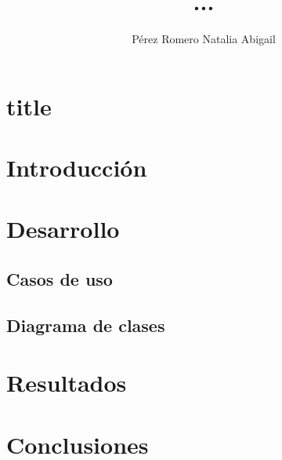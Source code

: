 \documentclass[letterpaper,12pt,oneside]{book}
\author{Pérez Romero Natalia Abigail}
\title{ ...}
\begin{document}
\frontmatter
\maketitle


\mainmatter

\chapter{title}

\tableofcontents

\chapter{Introducción} %



%

\chapter{Desarrollo}




\section{Casos de uso}

\newpage


\newpage
\section{Diagrama de clases}


\chapter{Resultados}  %

\chapter{Conclusiones}  %


\end{document}
